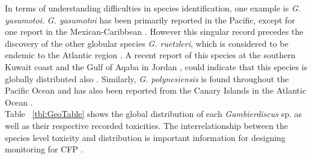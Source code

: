 \documentclass[12pt]{article}
\begin{document}
In terms of understanding difficulties in species identification, one example is \emph{G. yasumotoi}. \emph{G. yasumotoi} has been primarily reported in the Pacific, except for one report in the Mexican-Caribbean \cite{hernandez2004species}. However this singular record precedes the discovery of the other globular species \emph{G. ruetzleri}, which is considered to be endemic to the Atlantic region \cite{litaker2009taxonomy}. A recent report of this species at the southern Kuwait coast and the Gulf of Aqaba in Jordan \cite{saburova2013new}, could indicate that this species is globally distributed also \cite{xu2014distribution}.
Similarly, \emph{G. polynesiensis} is found throughout the Pacific Ocean and has also been reported from the Canary Islands in the Atlantic Ocean \cite{fraga2011gambierdiscus}. \\
 Table ~\ref{tbl:GeoTable} shows the global distribution of each \emph{Gambierdiscus} sp. as well as their respective recorded toxicities. The interrelationship between the species level toxicity and distribution is important information for designing monitoring for CFP \cite{testerICHA}.

	
\end{document}
